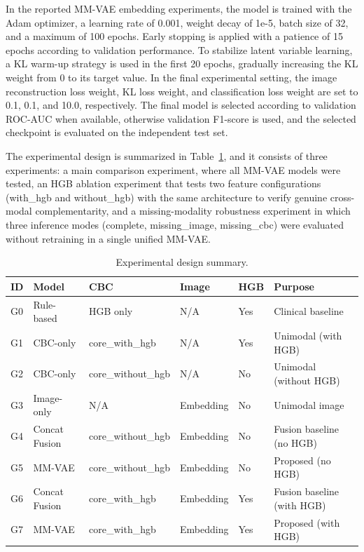 \documentclass[conference]{IEEEtran}
\begin{document}
In the reported MM-VAE embedding experiments, the model is trained with the Adam optimizer, a learning rate of 0.001, weight decay of 1e-5, batch size of 32, and a maximum of 100 epochs. Early stopping is applied with a patience of 15 epochs according to validation performance. To stabilize latent variable learning, a KL warm-up strategy is used in the first 20 epochs, gradually increasing the KL weight from 0 to its target value. In the final experimental setting, the image reconstruction loss weight, KL loss weight, and classification loss weight are set to 0.1, 0.1, and 10.0, respectively. The final model is selected according to validation ROC-AUC when available, otherwise validation F1-score is used, and the selected checkpoint is evaluated on the independent test set.

The experimental design is summarized in Table~\ref{tab:experiment-design}, and it consists of three experiments: a main comparison experiment, where all MM-VAE models were tested, an HGB ablation experiment that tests two feature configurations (with\_hgb and without\_hgb) with the same architecture to verify genuine cross-modal complementarity, and a missing-modality robustness experiment in which three inference modes (complete, missing\_image, missing\_cbc) were evaluated without retraining in a single unified MM-VAE.

\begin{table}[t]
\caption{Experimental design summary.}
\label{tab:experiment-design}
\centering
\small
\begin{tabular}{p{}p{}p{}p{}p{}p{}}
\hline
\textbf{ID} & \textbf{Model} & \textbf{CBC} & \textbf{Image} & \textbf{HGB} & \textbf{Purpose} \\
\hline
G0 & Rule-based & HGB only & N/A & Yes & Clinical baseline \\
G1 & CBC-only & core\_with\_hgb & N/A & Yes & Unimodal (with HGB) \\
G2 & CBC-only & core\_without\_hgb & N/A & No & Unimodal (without HGB) \\
G3 & Image-only & N/A & Embedding & No & Unimodal image \\
G4 & Concat Fusion & core\_without\_hgb & Embedding & No & Fusion baseline (no HGB) \\
G5 & MM-VAE & core\_without\_hgb & Embedding & No & Proposed (no HGB) \\
G6 & Concat Fusion & core\_with\_hgb & Embedding & Yes & Fusion baseline (with HGB) \\
G7 & MM-VAE & core\_with\_hgb & Embedding & Yes & Proposed (with HGB) \\
\hline
\end{tabular}
\end{table}
\end{document}
